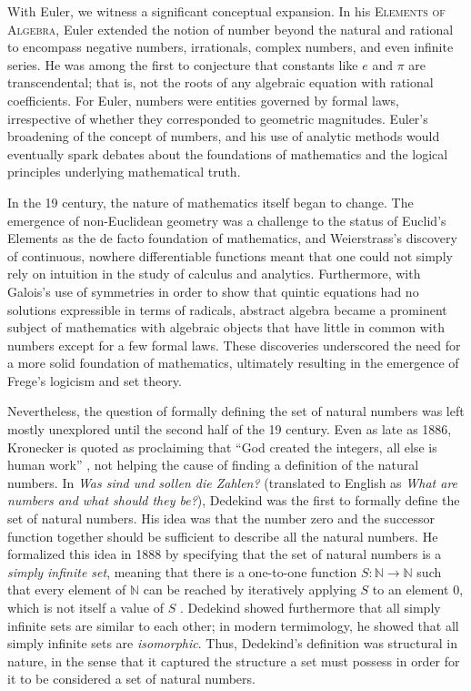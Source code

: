 With Euler, we witness a significant conceptual expansion. In his \textsc{Elements of Algebra}, Euler extended the notion of number beyond the natural and rational to encompass negative numbers, irrationals, complex numbers, and even infinite series. He was among the first to conjecture that constants like $e$ and $\pi$ are transcendental; that is, not the roots of any algebraic equation with rational coefficients. For Euler, numbers were entities governed by formal laws, irrespective of whether they corresponded to geometric magnitudes. Euler's broadening of the concept of numbers, and his use of analytic methods would eventually spark debates about the foundations of mathematics and the logical principles underlying mathematical truth.

In the 19\supth{} century, the nature of mathematics itself began to change. The emergence of non-Euclidean geometry was a challenge to the status of Euclid's Elements as the de facto foundation of mathematics, and Weierstrass's discovery of continuous, nowhere differentiable functions meant that one could not simply rely on intuition in the study of calculus and analytics. Furthermore, with Galois's use of symmetries in order to show that quintic equations had no solutions expressible in terms of radicals, abstract algebra became a prominent subject of mathematics with algebraic objects that have little in common with numbers except for a few formal laws. These discoveries underscored the need for a more solid foundation of mathematics, ultimately resulting in the emergence of Frege's logicism and set theory.

Nevertheless, the question of formally defining the set of natural numbers was left mostly unexplored until the second half of the 19\supth{} century. Even as late as 1886, Kronecker is quoted as proclaiming that ``God created the integers, all else is human work'' \cite{weber1893}, not helping the cause of finding a definition of the natural numbers. In \emph{Was sind und sollen die Zahlen?} (translated to English as \emph{What are numbers and what should they be?}), Dedekind was the first to formally define the set of natural numbers. His idea was that the number zero and the successor function together should be sufficient to describe all the natural numbers. He formalized this idea in 1888 by specifying that the set of natural numbers is a \emph{simply infinite set}, meaning that there is a one-to-one function $S:\mathbb{N}\to\mathbb{N}$ such that every element of $\mathbb{N}$ can be reached by iteratively applying $S$ to an element $0$, which is not itself a value of $S$ \cite{dedekind1888}. Dedekind showed furthermore that all simply infinite sets are similar to each other; in modern termimology, he showed that all simply infinite sets are \emph{isomorphic}. Thus, Dedekind's definition was structural in nature, in the sense that it captured the structure a set must possess in order for it to be considered a set of natural numbers.

